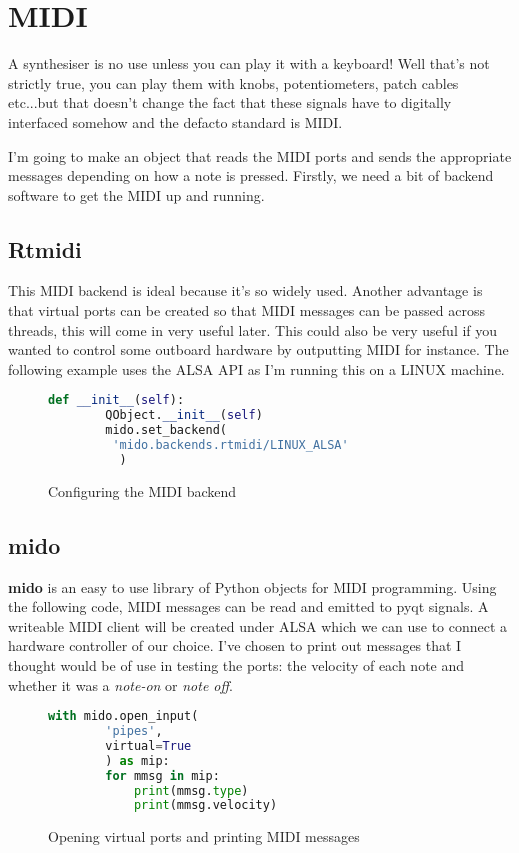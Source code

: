 \documentclass{article}
\begin{document}
\pagebreak
\section{MIDI}
A synthesiser is no use unless you can play it with a keyboard! Well that's not strictly true, you can play them with knobs, potentiometers, patch cables etc...but that doesn't change the fact that these signals have to digitally interfaced somehow and the defacto standard is MIDI.

\medskip I'm going to make an object that reads the MIDI ports and sends the appropriate messages depending on how a note is pressed. Firstly, we need a bit of backend software to get the MIDI up and running. 
\subsection{Rtmidi}
This MIDI backend is ideal because it's so widely used. Another advantage is that virtual ports can be created so that MIDI messages can be passed across threads, this will come in very useful later. This could also be very useful if you wanted to control some outboard hardware by outputting MIDI for instance. The following example uses the ALSA API as I'm running this on a LINUX machine.

 \begin{figure}[H]
	\begin{lstlisting}[language=python]
	def __init__(self):
		QObject.__init__(self)
		mido.set_backend(
		 'mido.backends.rtmidi/LINUX_ALSA'
		  )
	\end{lstlisting}
	\caption{Configuring the MIDI backend}
\end{figure}
\subsection{mido}
\textbf{mido} is an easy to use library of Python objects for MIDI programming. Using the following code, MIDI messages can be read and emitted to pyqt signals. A writeable MIDI client will be created under ALSA which we can use to connect a hardware controller of our choice. I've chosen to print out messages that I thought would be of use in testing the ports: the velocity of each note and whether it was a \textit{note-on} or \textit{note off}. 
 \begin{figure}[H]
	\begin{lstlisting}[language=python]
	with mido.open_input(
		'pipes',
		virtual=True
		) as mip:
		for mmsg in mip:
			print(mmsg.type)
			print(mmsg.velocity) 
	\end{lstlisting}
	\caption{Opening virtual ports and printing MIDI messages}
\end{figure}
	
\end{document}
